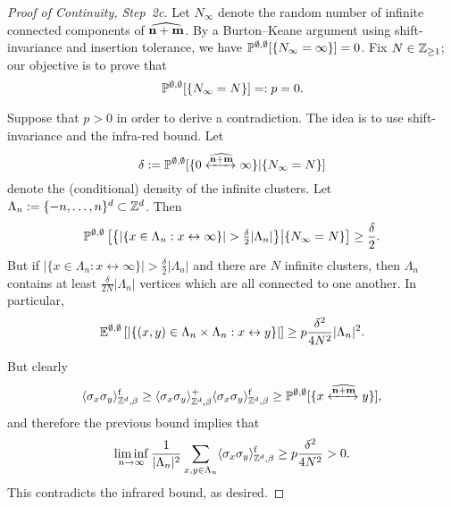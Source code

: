 \begin{proof}[Proof of Continuity, Step~2c]
    Let $N_\infty$ denote the random number of infinite connected components of $\widehat{\n+\m}$.
    By a Burton--Keane argument using shift-invariance and insertion tolerance,
    we have $\P^{\emptyset,\emptyset}[\{N_\infty=\infty\}]=0$.
    Fix $N\in\Z_{\geq 1}$; our objective is to prove that
    \[
        \P^{\emptyset,\emptyset}[\{N_\infty= N\}]=:p=0.
    \]

    Suppose that $p>0$ in order to derive a contradiction.
    The idea is to use shift-invariance and the infra-red bound.
    Let
    \[
        \delta:=\P^{\emptyset,\emptyset}[\{0\xleftrightarrow{\widehat{\n+\m}}\infty\}|\{N_\infty= N\}]
    \]
    denote the (conditional) density of the infinite clusters.
    Let $\Lambda_n:=\{-n,\dots,n\}^d\subset\Z^d$.
    Then
    \[
        \P^{\emptyset,\emptyset}\left[\left\{|\{x\in\Lambda_n:x\leftrightarrow\infty\}|>\tfrac{\delta}2|\Lambda_n|\right\}\middle|\{N_\infty= N\}\right]
        \geq
        \frac\delta2.
    \]
    But if $|\{x\in\Lambda_n:x\leftrightarrow\infty\}|>\tfrac{\delta}2|\Lambda_n|$
    and there are $N$ infinite clusters,
    then $\Lambda_n$ contains at least $\tfrac{\delta}{2N}|\Lambda_n|$
    vertices which are all connected to one another.
    In particular,
    \[
        \E^{\emptyset,\emptyset}\left[|\{(x,y)\in\Lambda_n\times\Lambda_n:x\leftrightarrow y\}|\right]
        \geq
        p
        \frac{\delta^2}{4N^2}|\Lambda_n|^2.
    \]

    But clearly
    \[
        \langle\sigma_x\sigma_y\rangle_{\Z^d,\beta}^\f
        \geq
        \langle\sigma_x\sigma_y\rangle_{\Z^d,\beta}^+
        \langle\sigma_x\sigma_y\rangle_{\Z^d,\beta}^\f
        \geq
        \P^{\emptyset,\emptyset}[\{x\xleftrightarrow{\widehat{\n+\m}}y\}],
    \]
    and therefore the previous bound implies that
    \[
        \liminf_{n\to\infty}\frac1{|\Lambda_n|^2}\sum_{x,y\in\Lambda_n}
        \langle\sigma_x\sigma_y\rangle_{\Z^d,\beta}^\f
        \geq p
        \frac{\delta^2}{4N^2}>0.
    \]
    This contradicts the infrared bound, as desired.
\end{proof}

